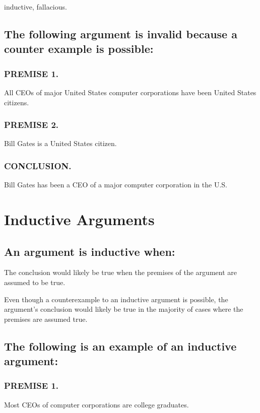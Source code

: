 \documentclass{article}
\begin{document}
inductive, fallacious.

    \subsection{The following argument is invalid because a counter example is possible:}

    \subsubsection{PREMISE 1.}
All CEOs of major United States computer corporations have been United States citizens.

    \subsubsection{PREMISE 2.}
Bill Gates is a United States citizen.

    \subsubsection{CONCLUSION.}
Bill Gates has been a CEO of a major computer corporation in the U.S.

    \section{Inductive Arguments}

    \subsection{An argument is inductive when:}

The conclusion would likely be true when the premises of the argument are assumed to be true.

Even though a counterexample to an inductive argument is possible, the argument’s conclusion would likely be true in the majority of cases where the premises are assumed true.

    \subsection{The following is an example of an inductive argument:}

    \subsubsection{PREMISE 1.}
Most CEOs of computer corporations are college graduates.
\end{document}
